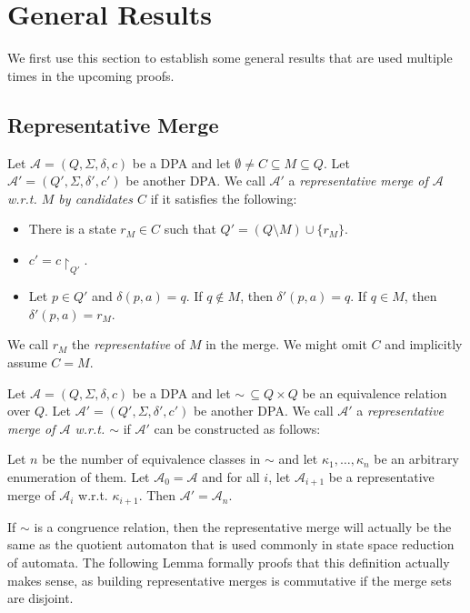 \section{General Results}
We first use this section to establish some general results that are used multiple times in the upcoming proofs.

\subsection{Representative Merge}

\begin{defn}
	Let $\mathcal{A} = (Q, \Sigma, \delta, c)$ be a DPA and let $\emptyset \neq C \subseteq M \subseteq Q$. Let $\mathcal{A}' = (Q', \Sigma, \delta', c')$ be another DPA. We call $\mathcal{A}'$ a \emph{representative merge of $\mathcal{A}$ w.r.t. $M$ by candidates $C$} if it satisfies the following:
	\begin{itemize}
		\item There is a state $r_M \in C$ such that $Q' = (Q \setminus M) \cup \{r_M\}$.
		\item $c' = c\upharpoonright_{Q'}$.
		\item Let $p \in Q'$ and $\delta(p, a) = q$. If $q \notin M$, then $\delta'(p, a) = q$. If $q \in M$, then $\delta'(p, a) = r_M$.
	\end{itemize}
	
	We call $r_M$ the \emph{representative} of $M$ in the merge. We might omit $C$ and implicitly assume $C = M$.
\end{defn}

\begin{defn}
	Let $\mathcal{A} = (Q, \Sigma, \delta, c)$ be a DPA and let $\sim \,\subseteq Q \times Q$ be an equivalence relation over $Q$. Let $\mathcal{A}' = (Q', \Sigma, \delta', c')$ be another DPA. We call $\mathcal{A}'$ a \emph{representative merge of $\mathcal{A}$ w.r.t. $\sim$} if $\mathcal{A}'$ can be constructed as follows:
	
	Let $n$ be the number of equivalence classes in $\sim$ and let $\kappa_1, \dots, \kappa_n$ be an arbitrary enumeration of them. Let $\mathcal{A}_0 = \mathcal{A}$ and for all $i$, let $\mathcal{A}_{i+1}$ be a representative merge of $\mathcal{A}_i$ w.r.t. $\kappa_{i+1}$. Then $\mathcal{A}' = \mathcal{A}_n$.
\end{defn}

If $\sim$ is a congruence relation, then the representative merge will actually be the same as the quotient automaton that is used commonly in state space reduction of automata. The following Lemma formally proofs that this definition actually makes sense, as building representative merges is commutative if the merge sets are disjoint.


